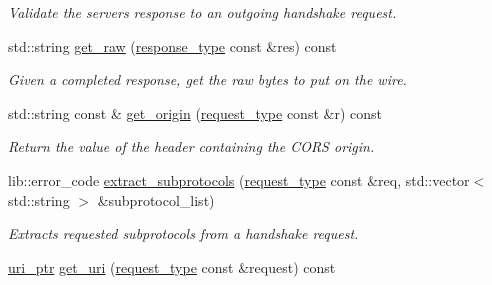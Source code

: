 \begin{DoxyCompactItemize}
\begin{DoxyCompactList}\small\item\em Validate the server\textquotesingle{}s response to an outgoing handshake request. \end{DoxyCompactList}\item 
std\+::string \hyperlink{classwebsocketpp_1_1processor_1_1hybi13_ab1055402f24f2977c8141eab25b5ee26}{get\+\_\+raw} (\hyperlink{classwebsocketpp_1_1http_1_1parser_1_1response}{response\+\_\+type} const \&res) const\hypertarget{classwebsocketpp_1_1processor_1_1hybi13_ab1055402f24f2977c8141eab25b5ee26}{}\label{classwebsocketpp_1_1processor_1_1hybi13_ab1055402f24f2977c8141eab25b5ee26}

\begin{DoxyCompactList}\small\item\em Given a completed response, get the raw bytes to put on the wire. \end{DoxyCompactList}\item 
std\+::string const  \& \hyperlink{classwebsocketpp_1_1processor_1_1hybi13_a02883529d8bf03682c67a4d81a0ef7d5}{get\+\_\+origin} (\hyperlink{classwebsocketpp_1_1http_1_1parser_1_1request}{request\+\_\+type} const \&r) const\hypertarget{classwebsocketpp_1_1processor_1_1hybi13_a02883529d8bf03682c67a4d81a0ef7d5}{}\label{classwebsocketpp_1_1processor_1_1hybi13_a02883529d8bf03682c67a4d81a0ef7d5}

\begin{DoxyCompactList}\small\item\em Return the value of the header containing the C\+O\+RS origin. \end{DoxyCompactList}\item 
lib\+::error\+\_\+code \hyperlink{classwebsocketpp_1_1processor_1_1hybi13_a3d3b0e51df97cd7c8dcde00fb3003a34}{extract\+\_\+subprotocols} (\hyperlink{classwebsocketpp_1_1http_1_1parser_1_1request}{request\+\_\+type} const \&req, std\+::vector$<$ std\+::string $>$ \&subprotocol\+\_\+list)
\begin{DoxyCompactList}\small\item\em Extracts requested subprotocols from a handshake request. \end{DoxyCompactList}\item 
\hyperlink{namespacewebsocketpp_aae370ea5ac83a8ece7712cb39fc23f5b}{uri\+\_\+ptr} \hyperlink{classwebsocketpp_1_1processor_1_1hybi13_a49ae173c8cdef4e78c472a46200df8d0}{get\+\_\+uri} (\hyperlink{classwebsocketpp_1_1http_1_1parser_1_1request}{request\+\_\+type} const \&request) const\hypertarget{classwebsocketpp_1_1processor_1_1hybi13_a49ae173c8cdef4e78c472a46200df8d0}{}\label{classwebsocketpp_1_1processor_1_1hybi13_a49ae173c8cdef4e78c472a46200df8d0}


\end{DoxyCompactItemize}
